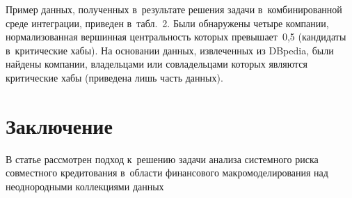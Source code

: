 \begin{multicols}{2}
      Пример данных, полученных в~результате решения задачи 
в~комбинированной среде интеграции, приведен в~табл.~2. Были обнаружены 
четыре компании, нормализованная вершинная центральность которых 
превышает~0,5 (кандидаты в~критические хабы). На основании данных, 
извлеченных из DBpedia, были найдены компании, владельцами или 
совладельцами которых являются критические хабы (приведена лишь часть 
данных).
      


\vspace*{-4pt}

\section{Заключение}

\vspace*{-2pt}

      В статье рассмотрен подход к~решению задачи анализа системного 
риска совместного кредитования в~области финансового макромоделирования 
над неоднородными коллекциями данных\linebreak\vspace*{-12pt}

\pagebreak

\end{multicols}

\begin{figure} %
\vspace*{1pt}
 \begin{center}
 \mbox{%
 \epsfxsize=148.304mm
 }
 \end{center}
 \vspace*{-9pt}
\end{figure}

